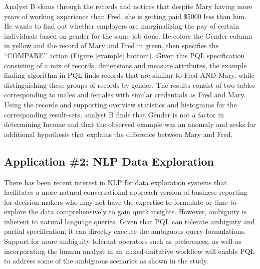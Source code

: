 \documentclass{sig-alternate-05-2015}
\begin{document}
\par Analyst B skims through the records and notices that despite Mary having more years of working experience than Fred, she is getting paid \$5000 less than him. He wants to find out whether employers are marginalizing the pay of certain individuals based on gender for the same job done. He colors the Gender column in yellow and the record of Mary and Fred in green, then specifies the ``COMPARE'' action (Figure \ref{example} bottom). Given this PQL specification consisting of a mix of records, dimensions and measure attributes, the example finding algorithm in PQL finds records that are similar to Fred AND Mary, while distinguishing these groups of records by gender. The results consist of two tables corresponding to males and females with similar credentials as Fred and Mary. Using the records and supporting overview statistics and histograms for the corresponding result-sets, analyst B finds that Gender is not a factor in determining Income and that the observed example was an anomaly and seeks for additional hypothesis that explains the difference between Mary and Fred.
\subsection{Application \#2: NLP Data Exploration}
There has been recent interest in NLP for data exploration systems that facilitates a more natural conversational approach version of business reporting for decision makers who may not have the expertise to formulate or time to explore the data comprehensively to gain quick insights\cite{tableauBIreport2018}. However, ambiguity is inherent to natural language queries\cite{Gao2015,Hoque2017}. Given that PQL can tolerate ambiguity and partial specification, it can directly execute the ambiguous query formulations. Support for more ambiguity tolerant operators such as preferences, as well as incorporating the human analyst in an mixed-imitative workflow will enable PQL to address some of the ambiguous scenarios as shown in the study.
\end{document}
